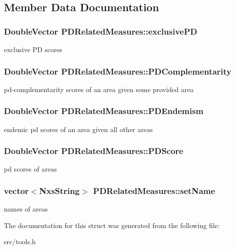 \subsection{Member Data Documentation}
\hypertarget{structPDRelatedMeasures_a2f579e206a60fb498f1f096364056fc4}{
\subsubsection[{exclusivePD}]{\setlength{\rightskip}{0pt plus 5cm}DoubleVector {\bf PDRelatedMeasures::exclusivePD}}}
\label{structPDRelatedMeasures_a2f579e206a60fb498f1f096364056fc4}
exclusive PD scores \hypertarget{structPDRelatedMeasures_a441d326b67a831588dc07ae3aeb996a4}{
\subsubsection[{PDComplementarity}]{\setlength{\rightskip}{0pt plus 5cm}DoubleVector {\bf PDRelatedMeasures::PDComplementarity}}}
\label{structPDRelatedMeasures_a441d326b67a831588dc07ae3aeb996a4}
pd-\/complementarity scores of an area given some provided area \hypertarget{structPDRelatedMeasures_a995d83e663bf9bf39dbcf8e0c93b3c53}{
\subsubsection[{PDEndemism}]{\setlength{\rightskip}{0pt plus 5cm}DoubleVector {\bf PDRelatedMeasures::PDEndemism}}}
\label{structPDRelatedMeasures_a995d83e663bf9bf39dbcf8e0c93b3c53}
endemic pd scores of an area given all other areas \hypertarget{structPDRelatedMeasures_a2d20e4c7fb660ce8571723b3116032c4}{
\subsubsection[{PDScore}]{\setlength{\rightskip}{0pt plus 5cm}DoubleVector {\bf PDRelatedMeasures::PDScore}}}
\label{structPDRelatedMeasures_a2d20e4c7fb660ce8571723b3116032c4}
pd scores of areas \hypertarget{structPDRelatedMeasures_ae7a4293fcd630131eb7eaf2a66f7540d}{
\subsubsection[{setName}]{\setlength{\rightskip}{0pt plus 5cm}vector$<${\bf NxsString}$>$ {\bf PDRelatedMeasures::setName}}}
\label{structPDRelatedMeasures_ae7a4293fcd630131eb7eaf2a66f7540d}
names of areas 

The documentation for this struct was generated from the following file:\begin{DoxyCompactItemize}
\item 
src/tools.h\end{DoxyCompactItemize}
